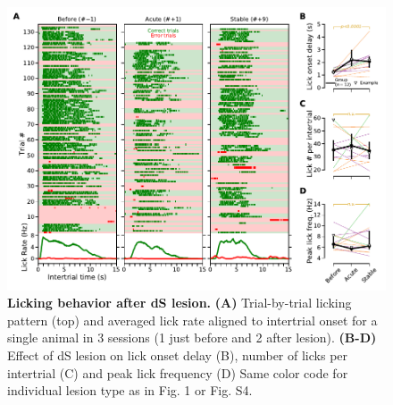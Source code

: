 \begin{figure}[tbh!]
  \begin{center}
  \includegraphics[width=\textwidth]{ch-lesion/figures/Lick.pdf}
   \caption
   {\textbf{Licking behavior after dS lesion.}
   \textbf{(A)} Trial-by-trial licking pattern (top) and averaged lick rate aligned to intertrial onset for a single animal in 3 sessions (1 just before and 2 after lesion). 
   \textbf{(B-D)} Effect of dS lesion on lick onset delay (B), number of licks per intertrial (C) and peak lick frequency (D)
 Same color code for individual lesion type as in Fig. 1 or Fig. S4.
   }
   \label{fig:lesion:lick}
  \end{center}
 \end{figure}